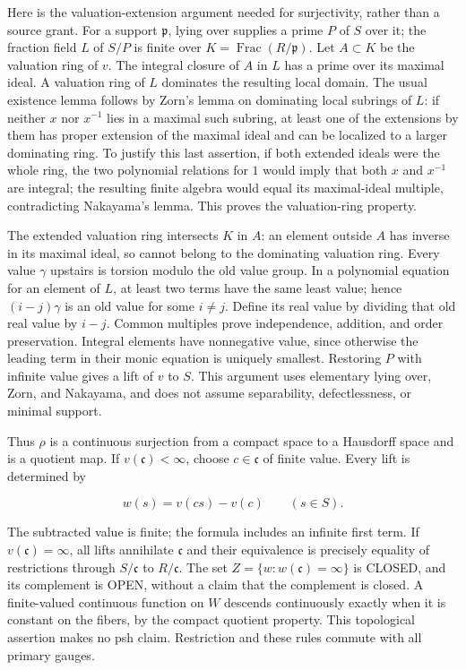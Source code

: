 \documentclass[11pt]{article}
\begin{document}
Here is the valuation-extension argument needed for surjectivity, rather than a source grant. For a support $\mathfrak p$, lying over supplies a prime $P$ of $S$ over it; the fraction field $L$ of $S/P$ is finite over $K=\operatorname{Frac}(R/\mathfrak p)$. Let $A\subset K$ be the valuation ring of $v$. The integral closure of $A$ in $L$ has a prime over its maximal ideal. A valuation ring of $L$ dominates the resulting local domain. The usual existence lemma follows by Zorn's lemma on dominating local subrings of $L$: if neither $x$ nor $x^{-1}$ lies in a maximal such subring, at least one of the extensions by them has proper extension of the maximal ideal and can be localized to a larger dominating ring. To justify this last assertion, if both extended ideals were the whole ring, the two polynomial relations for $1$ would imply that both $x$ and $x^{-1}$ are integral; the resulting finite algebra would equal its maximal-ideal multiple, contradicting Nakayama's lemma. This proves the valuation-ring property.

The extended valuation ring intersects $K$ in $A$: an element outside $A$ has inverse in its maximal ideal, so cannot belong to the dominating valuation ring. Every value $\gamma$ upstairs is torsion modulo the old value group. In a polynomial equation for an element of $L$, at least two terms have the same least value; hence $(i-j)\gamma$ is an old value for some $i\ne j$. Define its real value by dividing that old real value by $i-j$. Common multiples prove independence, addition, and order preservation. Integral elements have nonnegative value, since otherwise the leading term in their monic equation is uniquely smallest. Restoring $P$ with infinite value gives a lift of $v$ to $S$. This argument uses elementary lying over, Zorn, and Nakayama, and does not assume separability, defectlessness, or minimal support.

Thus $\rho$ is a continuous surjection from a compact space to a Hausdorff space and is a quotient map. If $v(\mathfrak c)<\infty$, choose $c\in\mathfrak c$ of finite value. Every lift is determined by

\[
w(s)=v(cs)-v(c)\qquad(s\in S).
\]

The subtracted value is finite; the formula includes an infinite first term. If $v(\mathfrak c)=\infty$, all lifts annihilate $\mathfrak c$ and their equivalence is precisely equality of restrictions through $S/\mathfrak c$ to $R/\mathfrak c$. The set $Z=\{w:w(\mathfrak c)=\infty\}$ is CLOSED, and its complement is OPEN, without a claim that the complement is closed. A finite-valued continuous function on $W$ descends continuously exactly when it is constant on the fibers, by the compact quotient property. This topological assertion makes no psh claim. Restriction and these rules commute with all primary gauges.
\end{document}
